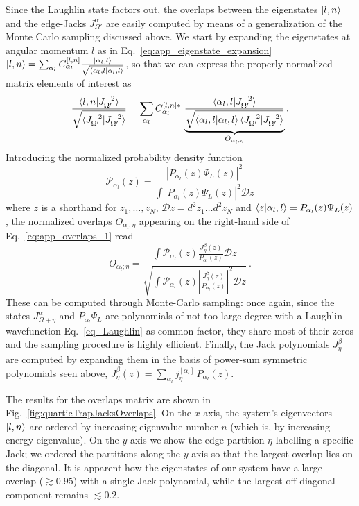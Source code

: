 \documentclass[twocolumn,pra,superscriptaddress,noshowpacs]{revtex4}
\begin{document}
Since the Laughlin state factors out, the overlaps between the eigenstates $\ket{l,n}$ and the  edge-Jacks $J_{\Omega'}^{\alpha}$ are easily computed by means of a generalization of the Monte Carlo sampling discussed above. We start by expanding the eigenstates at angular momentum $l$ as in Eq.~\eqref{eq:app_eigenstate_expansion} $\ket{l,n}=\sum_{\alpha_l} C_{\alpha_l}^{[l,n]} \frac{\ket{\alpha_l,l}}{\sqrt{\braket{\alpha_l,l|\alpha_l,l}}}$, so that we can express the properly-normalized matrix elements of interest as
\begin{equation}
    \label{eq:app_overlaps_1}
    \frac{\braket{l,n|J_{\Omega'}^{-2}}}{\sqrt{\braket{J_{\Omega'}^{-2}|J_{\Omega'}^{-2}}}}
    =
    \sum_{\alpha_l} C_{\alpha_l}^{[l,n]*}\,
    \underbrace{\frac{\braket{\alpha_l,l|J_{\Omega'}^{-2}}   }{\sqrt{\braket{\alpha_l,l|\alpha_l,l}\braket{J_{\Omega'}^{-2}|J_{\Omega'}^{-2}}}}}_{O_{\alpha_l;\eta}}.
\end{equation}
Introducing the normalized probability density function
\begin{equation}
    \mathcal P_{\alpha_l}(z) = \frac{|P_{\alpha_l}(z) \Psi_L(z)|^2}{\int |P_{\alpha_l}(z) \Psi_L(z)|^2\mathcal D z}
\end{equation}
where $z$ is a shorthand for $z_1,\hdots,z_N$, $\mathcal D z=d^2z_1\hdots d^2z_N$ and $\braket{z|\alpha_l,l}=P_{\alpha_l}(z) \Psi_L(z)$, the normalized overlaps $O_{\alpha_l;\eta}$ appearing on the right-hand side of Eq.~\eqref{eq:app_overlaps_1} read
\begin{equation}
    O_{\alpha_l;\eta} = \frac{\int \mathcal P_{\alpha_l}(z)\frac{J_\eta^\beta(z)}{P_{\alpha_l}(z)}\mathcal Dz}{\sqrt{\int \mathcal P_{\alpha_l}(z) \left|\frac{J_\eta^\beta(z)}{P_{\alpha_l}(z)}\right|^2\mathcal Dz}}\,.
\end{equation}
These can be computed through Monte-Carlo sampling: once again, since the states $J_{\Omega+\eta}^{\alpha}$ and $P_{\alpha_l}\Psi_L$ are polynomials of not-too-large degree with a Laughlin wavefunction Eq.~\eqref{eq_Laughlin} as common factor, they share most of their zeros and the sampling procedure is highly efficient.
Finally, the Jack polynomials $J_\eta^\beta$ are computed by expanding them in the basis of power-sum symmetric polynomials seen above, $J_\eta^\beta(z)=\sum_{\alpha_l} j_{\eta}^{[\alpha_l]}\,P_{\alpha_l}(z)$.

The results for the overlaps matrix are shown in Fig.~\ref{fig:quarticTrapJacksOverlaps}. On the $x$ axis, the system's eigenvectors $\ket{l,n}$ are ordered by increasing eigenvalue number $n$ (which is, by increasing energy eigenvalue). On the $y$ axis we show the edge-partition $\eta$ labelling a specific Jack; we ordered the partitions along the $y$-axis so that the largest overlap lies on the diagonal.
It is apparent how the eigenstates of our system have a large overlap ($\gtrsim0.95$) with a single Jack polynomial, while the largest off-diagonal component remains $\lesssim0.2$.
\end{document}
